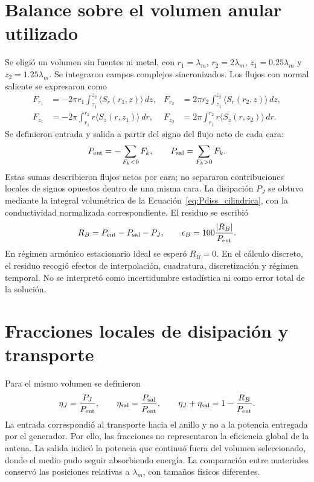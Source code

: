 \section{Balance sobre el volumen anular utilizado}
Se eligió un volumen sin fuentes ni metal, con $r_1=\lambda_m$, $r_2=2\lambda_m$, $z_1=0.25\lambda_m$ y $z_2=1.25\lambda_m$. Se integraron campos complejos sincronizados. Los flujos con normal saliente se expresaron como
\begin{align}
F_{r_1}&=-2\pi r_1\int_{z_1}^{z_2}\langle S_r(r_1,z)\rangle\,dz, &
F_{r_2}&=2\pi r_2\int_{z_1}^{z_2}\langle S_r(r_2,z)\rangle\,dz,\\
F_{z_1}&=-2\pi\int_{r_1}^{r_2}r\langle S_z(r,z_1)\rangle\,dr, &
F_{z_2}&=2\pi\int_{r_1}^{r_2}r\langle S_z(r,z_2)\rangle\,dr.
\end{align}
Se definieron entrada y salida a partir del signo del flujo neto de cada cara:
\begin{equation}
P_{\rm ent}=-\sum_{F_k<0}F_k,\qquad P_{\rm sal}=\sum_{F_k>0}F_k.
\end{equation}
Estas sumas describieron flujos netos por cara; no separaron contribuciones locales de signos opuestos dentro de una misma cara. La disipación $P_J$ se obtuvo mediante la integral volumétrica de la Ecuación~\ref{eq:Pdiss_cilindrica}, con la conductividad normalizada correspondiente. El residuo se escribió
\begin{equation}
R_B=P_{\rm ent}-P_{\rm sal}-P_J,\qquad
\epsilon_B=100\frac{|R_B|}{P_{\rm ent}}.
\label{eq:error_balance}
\end{equation}
En régimen armónico estacionario ideal se esperó $R_B=0$. En el cálculo discreto, el residuo recogió efectos de interpolación, cuadratura, discretización y régimen temporal. No se interpretó como incertidumbre estadística ni como error total de la solución.

\section{Fracciones locales de disipación y transporte}
Para el mismo volumen se definieron
\begin{equation}
\eta_J=\frac{P_J}{P_{\rm ent}},\qquad
\eta_{\rm sal}=\frac{P_{\rm sal}}{P_{\rm ent}},\qquad
\eta_J+\eta_{\rm sal}=1-\frac{R_B}{P_{\rm ent}}.
\label{eq:fracciones_balance}
\end{equation}
La entrada correspondió al transporte hacia el anillo y no a la potencia entregada por el generador. Por ello, las fracciones no representaron la eficiencia global de la antena. La salida indicó la potencia que continuó fuera del volumen seleccionado, donde el medio pudo seguir absorbiendo energía. La comparación entre materiales conservó las posiciones relativas a $\lambda_m$, con tamaños físicos diferentes.

